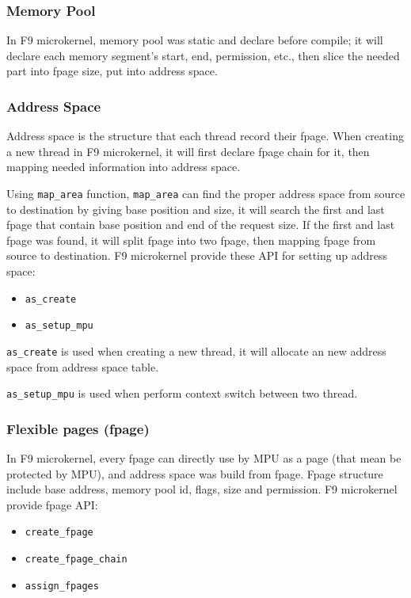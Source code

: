 \documentclass[10pt,preprint,nocopyrightspace]{sigplanconf}
\begin{document}
\subsubsection{Memory Pool}
In F9 microkernel, memory pool was static and declare before compile; it will declare each memory segment's start, end, permission, etc., then slice the needed part into fpage size, put into address space.

\subsubsection{Address Space}
Address space is the structure that each thread record their fpage. When creating a new thread in F9 microkernel, it will first declare fpage chain for it, then mapping needed information into address space.

Using \texttt{map{\_}area} function, \texttt{map{\_}area} can find the proper address space from source to destination by giving base position and size, it will search the first and last fpage that contain base position and end of the request size. If the first and last fpage was found, it will split fpage into two fpage, then mapping fpage from source to destination. F9 microkernel provide these API for setting up address space: 
\begin{itemize}
\item \verb|as_create|
\item \verb|as_setup_mpu|
\end{itemize}

\verb|as_create| is used when creating a new thread, it will allocate an new address space from address space table.

\verb|as_setup_mpu| is used when perform context switch between two thread.


\subsubsection{Flexible pages (fpage)}
In F9 microkernel, every fpage can directly use by MPU as a page (that mean be protected by MPU), and address space was build from fpage. Fpage structure include base address, memory pool id, flags, size and permission. F9 microkernel provide fpage API:
\begin{itemize}
	\item \verb|create_fpage|
	\item \verb|create_fpage_chain|
	\item \verb|assign_fpages|
\end{itemize}
\end{document}

